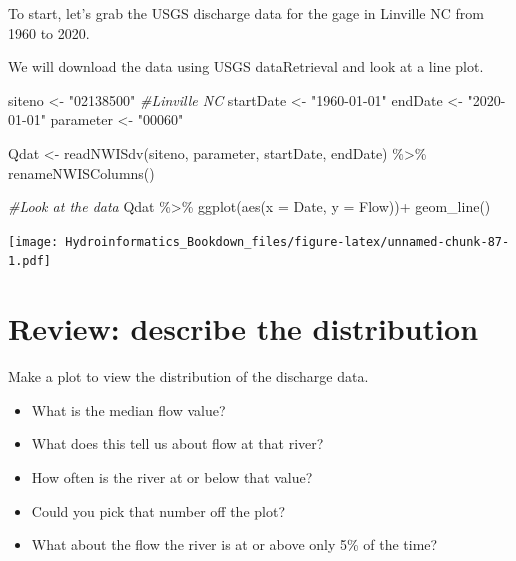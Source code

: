 \documentclass[
]{book}
\newenvironment{Shaded}{\begin{snugshade}}{\end{snugshade}}
\newcommand{\AttributeTok}[1]{\textcolor[rgb]{0.77,0.63,0.00}{#1}}
\newcommand{\CommentTok}[1]{\textcolor[rgb]{0.56,0.35,0.01}{\textit{#1}}}
\newcommand{\FunctionTok}[1]{\textcolor[rgb]{0.00,0.00,0.00}{#1}}
\newcommand{\NormalTok}[1]{#1}
\newcommand{\OtherTok}[1]{\textcolor[rgb]{0.56,0.35,0.01}{#1}}
\newcommand{\SpecialCharTok}[1]{\textcolor[rgb]{0.00,0.00,0.00}{#1}}
\newcommand{\StringTok}[1]{\textcolor[rgb]{0.31,0.60,0.02}{#1}}
\providecommand{\tightlist}{%
  \setlength{\itemsep}{0pt}\setlength{\parskip}{0pt}}
\begin{document}
To start, let's grab the USGS discharge data for the gage in Linville NC from 1960 to 2020.

We will download the data using USGS dataRetrieval and look at a line plot.

\begin{Shaded}
\begin{Highlighting}[]
\NormalTok{siteno }\OtherTok{\textless{}{-}} \StringTok{"02138500"} \CommentTok{\#Linville NC}
\NormalTok{startDate }\OtherTok{\textless{}{-}} \StringTok{"1960{-}01{-}01"}
\NormalTok{endDate }\OtherTok{\textless{}{-}} \StringTok{"2020{-}01{-}01"}
\NormalTok{parameter }\OtherTok{\textless{}{-}} \StringTok{"00060"}

\NormalTok{Qdat }\OtherTok{\textless{}{-}} \FunctionTok{readNWISdv}\NormalTok{(siteno, parameter, startDate, endDate) }\SpecialCharTok{\%\textgreater{}\%} 
  \FunctionTok{renameNWISColumns}\NormalTok{()}

\CommentTok{\#Look at the data}
\NormalTok{Qdat }\SpecialCharTok{\%\textgreater{}\%} \FunctionTok{ggplot}\NormalTok{(}\FunctionTok{aes}\NormalTok{(}\AttributeTok{x =}\NormalTok{ Date, }\AttributeTok{y =}\NormalTok{ Flow))}\SpecialCharTok{+}
  \FunctionTok{geom\_line}\NormalTok{()}
\end{Highlighting}
\end{Shaded}

\texttt{[image: Hydroinformatics\_Bookdown\_files/figure-latex/unnamed-chunk-87-1.pdf]}

\hypertarget{review-describe-the-distribution}{%
\section{Review: describe the distribution}\label{review-describe-the-distribution}}

Make a plot to view the distribution of the discharge data.

\begin{itemize}
\tightlist
\item
  What is the median flow value?
\item
  What does this tell us about flow at that river?
\item
  How often is the river at or below that value?
\item
  Could you pick that number off the plot?
\item
  What about the flow the river is at or above only 5\% of the time?
\end{itemize}
\end{document}
